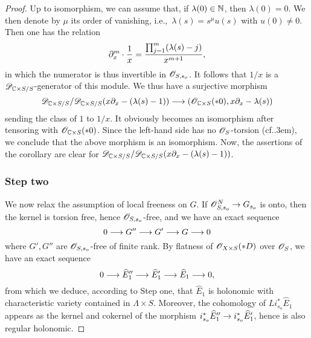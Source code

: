 \documentclass[english]{smfart}
\numberwithin{subsection}{section}
\newcommand{\XS}{X\times S}
\let\wh\widehat
\def\cf{cf.\kern.3em}
\def\ie{i.e.,\ }
\numberwithin{equation}{section}
\theoremstyle{plain}
\theoremstyle{definition}
\def\to{\mathchoice{\longrightarrow}{\rightarrow}{\rightarrow}{\rightarrow}}
\let\oldprod\prod
\renewcommand{\prod}{\mathop{\textstyle\oldprod}\displaylimits}
\begin{document}
\begin{proof}
Up to isomorphism, we can assume that, if $\lambda(0)\in\mathbb{N}$, then $\lambda(0)=0$. We then denote by $\mu$ its order of vanishing, \ie $\lambda(s)=s^\mu u(s)$ with $u(0)\neq0$. Then one has the relation
\[
\partial_x^m\cdot\frac1x=\frac{\prod_{j=1}^m(\lambda(s)-j)}{x^{m+1}},
\]
in which the numerator is thus invertible in $\cO_{S,s_o}$. It follows that $1/x$ is a $\cD_{\CC\times S/S}$-generator of this module. We thus have a surjective morphism
\[
\cD_{\CC\times S/S}/\cD_{\CC\times S/S}(x\partial_x-(\lambda(s)-1))\to (\cO_{\CC\times S}(*0),x\partial_x-\lambda(s))
\]
sending the class of $1$ to $1/x$. It obviously becomes an isomorphism after tensoring with $\cO_{\CC\times S}(*0)$. Since the left-hand side has no $\cO_S$-torsion (\cf\cite[Ex.\,3.12]{MF-S12}), we conclude that the above morphism is an isomorphism. Now, the assertions of the corollary are clear for $\cD_{\CC\times S/S}/\cD_{\CC\times S/S}(x\partial_x-(\lambda(s)-1))$.

\subsubsection*{Step two}
We now relax the assumption of local freeness on $G$. If $\cO_{S,s_o}^N\to G_{s_o}$ is onto, then the kernel is torsion free, hence $\cO_{S,s_o}$-free, and we have an exact sequence
\[
0\to G''\to G'\to G\to0
\]
where $G',G''$ are $\cO_{S,s_o}$-free of finite rank. By flatness of $\cO_{\XS}(*D)$ over $\cO_S$, we have an exact sequence
\[
0\to\wh E''_1\to\wh E'_1\to\wh E_1\to0,
\]
from which we deduce, according to Step one, that $\wh E_1$ is holonomic with characteristic variety contained in $\Lambda\times S$. Moreover, the cohomology of $Li_{s_o}^*\wh E_1$ appears as the kernel and cokernel of the morphism $i_{s_o}^*\wh E''_1\to i_{s_o}^*\wh E'_1$, hence is also regular holonomic.
\end{proof}
\end{document}
